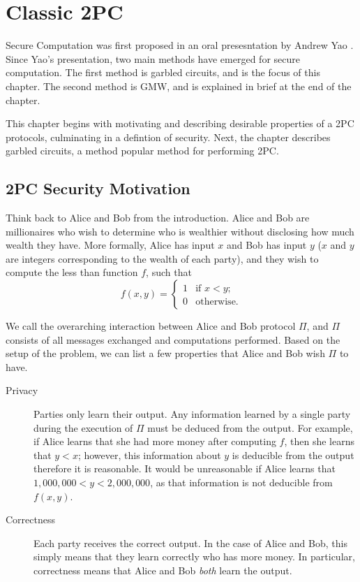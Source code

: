 \chapter{Classic 2PC}
Secure Computation was first proposed in an oral presesntation by Andrew Yao \cite{yao86}.
Since Yao's presentation, two main methods have emerged for secure computation.
The first method is garbled circuits, and is the focus of this chapter.
The second method is GMW, and is explained in brief at the end of the chapter.

This chapter begins with motivating and describing desirable properties of a 2PC protocols, culminating in a defintion of security. 
Next, the chapter describes garbled circuits, a method popular method for performing 2PC.

\section{2PC Security Motivation}
Think back to Alice and Bob from the introduction. 
Alice and Bob are millionaires who wish to determine who is wealthier without disclosing how much wealth they have.
More formally, Alice has input $x$ and Bob has input $y$ ($x$ and $y$ are integers corresponding to the wealth of each party), and they wish to compute the less than function $f$, such that 
\begin{equation}
f(x,y) = \left\{
\begin{array}{lr}
    1 & \text{if } x < y \text{;} \\
    0 & \text{otherwise.}
\end{array}
\right.
\end{equation} 

We call the overarching interaction between Alice and Bob protocol $\Pi$, and $\Pi$ consists of all messages exchanged and computations performed.
Based on the setup of the problem, we can list a few properties that Alice and Bob wish $\Pi$ to have.
\begin{description}
    \item[Privacy] 
        Parties only learn their output. 
        Any information learned by a single party during the execution of $\Pi$ must be deduced from the output. 
        For example, if Alice learns that she had more money after computing $f$, then she learns that $y < x$; however, this information about $y$ is deducible from the output therefore it is reasonable.
        It would be unreasonable if Alice learns that $1,000,000 < y < 2,000,000$, as that information is not deducible from $f(x,y)$.
    \item[Correctness] 
        Each party receives the correct output.
        In the case of Alice and Bob, this simply means that they learn correctly who has more money.
        In particular, correctness means that Alice and Bob \textit{both} learn the output.

\end{description}

